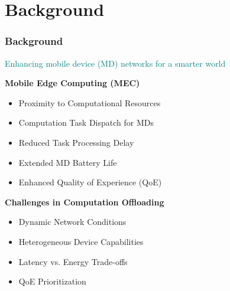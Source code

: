 \section{Background}

\begin{frame}
	\frametitle{Background}
	
\textcolor{teal}{Enhancing mobile device (MD) networks for a smarter world}
	\vspace{3mm}
			
	\textbf{Mobile Edge Computing (MEC)}
	\vspace{1mm}
	

	
	
	\begin{itemize}[]

		\item Proximity to Computational Resources
		\item Computation Task Dispatch for MDs
		\item Reduced Task Processing Delay
		\item Extended MD Battery Life
		\item Enhanced Quality of Experience (QoE)
	\end{itemize}
	
	\vspace{3mm}
	
	\textbf{Challenges in Computation Offloading}
	\vspace{1mm}
	

	
	\begin{itemize}
		\item Dynamic Network Conditions
		\item Heterogeneous Device Capabilities
		\item Latency vs. Energy Trade-offs
		\item QoE Prioritization
	\end{itemize}
	
\end{frame}


